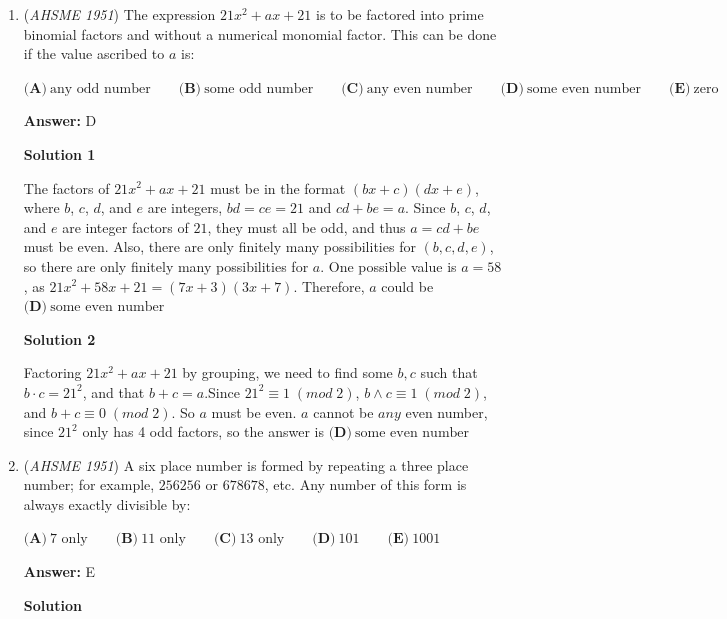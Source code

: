 \begin{enumerate}
 As we can see, the only equation without a "standard" form is $\textbf{(D)}$, so our answer is $\boxed{\textbf{(D)}\ 3x + y = 10}$



	\item (\textit{AHSME 1951}) The expression $21x^2+ax+21$ is to be factored into prime binomial factors and without a numerical monomial factor. This can be done if the value ascribed to $a$ is:


 $\textbf{(A)}\ \text{any odd number}\qquad\textbf{(B)}\ \text{some odd number}\qquad\textbf{(C)}\ \text{any even number}\qquad\textbf{(D)}\ \text{some even number}\qquad\textbf{(E)}\ \text{zero}$

 \textbf{Answer: }D



\textbf{Solution 1}

The factors of $21x^2+ax+21$ must be in the format $(bx+c)(dx+e)$, where $b$, $c$, $d$, and $e$ are integers, $bd = ce = 21$ and $cd + be = a$.  Since $b$, $c$, $d$, and $e$ are integer factors of $21$, they must all be odd, and thus $a = cd + be$ must be even.  Also, there are only finitely many possibilities for $(b, c, d, e)$, so there are only finitely many possibilities for $a$. One possible value is $a = 58$, as $21x^2 + 58x + 21 = (7x+3)(3x+7)$. Therefore, $a$ could be $\boxed{\textbf{(D)}\ \text{some even number}}$




\textbf{Solution 2}

Factoring $21x^2+ax+21$ by grouping, we need to find some $b,c$ such that $b\cdot c = 21^2$, and that $b+c=a$.Since $21^2\equiv 1\;(mod\;2)$, $b\land c \equiv 1\;(mod\;2)$, and $b+c \equiv 0\;(mod\;2)$. So $a$ must be even. $a$ cannot be $any$ even number, since $21^2$ only has 4 odd factors, so the answer is $\textbf{(D)}\ \text{some even number}$



	\item (\textit{AHSME 1951}) A six place number is formed by repeating a three place number; for example, $256256$ or $678678$, etc. Any number of this form is always exactly divisible by: 


 $\textbf{(A)}\ 7\text{ only}\qquad\textbf{(B)}\ 11\text{ only}\qquad\textbf{(C)}\ 13\text{ only}\qquad\textbf{(D)}\ 101\qquad\textbf{(E)}\ 1001$

 \textbf{Answer: }E



\textbf{Solution}


\end{enumerate}
